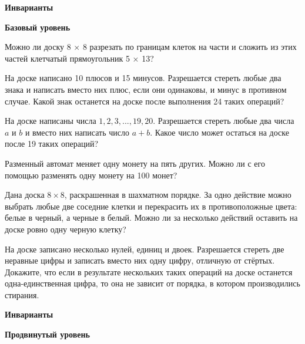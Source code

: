 \hspace{3mm}

\centerline{\bf \Huge Инварианты}

\centerline{\bf \large Базовый уровень}

\begin{flushright}
        \scriptsize{}
\end{flushright}




Можно ли доску 8 × 8 разрезать по границам клеток на части и сложить из этих частей клетчатый прямоугольник 5 × 13?

На доске написано 10 плюсов и 15 минусов. Разрешается стереть любые два знака и написать вместо них плюс, если они одинаковы, и минус в противном случае. Какой знак останется на доске после выполнения 24 таких операций?


На доске написаны числа $1, 2, 3, ..., 19, 20$. Разрешается стереть любые два числа $a$ и $b$ и вместо них написать число $a + b$. Какое число может остаться на доске после 19 таких операций?

Разменный автомат меняет одну монету на пять других. Можно ли с его помощью разменять одну монету на 100 монет?

Дана доска $8 \times 8$, раскрашенная в шахматном порядке. За одно действие можно выбрать любые две соседние клетки и перекрасить их в противоположные цвета: белые в черный, а черные в белый. Можно ли за несколько действий оставить на доске ровно одну черную клетку?

На доске записано несколько нулей, единиц и двоек. Разрешается стереть две неравные цифры и записать вместо них одну цифру, отличную от стёртых. Докажите, что если в результате нескольких таких операций на доске останется одна-единственная цифра, то она не зависит от порядка, в котором производились стирания.



\newpage

\hspace{3mm}

\centerline{\bf \Huge Инварианты}

\centerline{\bf \large Продвинутый уровень}

\begin{flushright}
        \scriptsize{}
\end{flushright}

